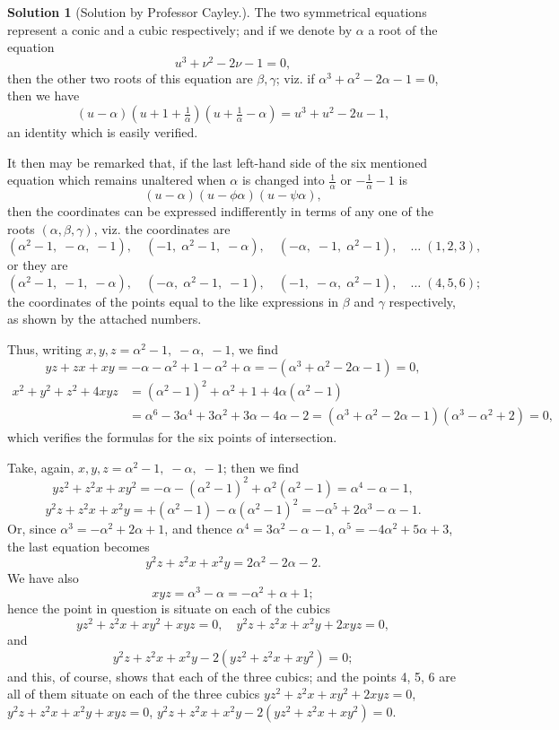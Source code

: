\documentclass[11pt,a4paper]{article}
\theoremstyle{definition}
\newtheorem*{solution}{Solution}
\begin{document}
\begin{solution}[Solution by Professor Cayley.]
The two symmetrical equations represent a conic and a cubic respectively; and if we denote by $\alpha$ a root of the equation
\[
u^3+\nu^2-2\nu-1=0,
\]
then the other two roots of this equation are $\beta, \gamma$; viz. if $\alpha^3+\alpha^2-2\alpha-1=0$, then we have
\[
(u-\alpha)(u+1+\tfrac{1}{\alpha})(u+\tfrac{1}{\alpha}-\alpha) = u^3+u^2-2u-1,
\]
an identity which is easily verified.

It then may be remarked that, if the last left-hand side of the six mentioned equation which remains unaltered when $\alpha$ is changed into $\frac{1}{\alpha}$ or $-\frac{1}{\alpha}-1$ is
\[
(u-\alpha)(u-\phi\alpha)(u-\psi\alpha),
\]
then the coordinates can be expressed indifferently in terms of any one of the roots $(\alpha,\beta,\gamma)$, viz. the coordinates are
\[
(\alpha^2-1, \; -\alpha, \; -1), \quad (-1, \; \alpha^2-1, \; -\alpha), \quad (-\alpha, \; -1, \; \alpha^2-1), \quad \ldots\; (1,2,3),
\]
or they are
\[
(\alpha^2-1, \; -1, \; -\alpha), \quad (-\alpha, \; \alpha^2-1, \; -1), \quad (-1, \; -\alpha, \; \alpha^2-1), \quad \ldots\; (4,5,6);
\]
the coordinates of the points equal to the like expressions in $\beta$ and $\gamma$ respectively, as shown by the attached numbers.

Thus, writing $x,y,z = \alpha^2-1, \; -\alpha, \; -1$, we find
\[
yz+zx+xy = -\alpha - \alpha^2 + 1 - \alpha^2 + \alpha = -(\alpha^3+\alpha^2-2\alpha-1) = 0,
\]
\[
\begin{aligned}
x^2+y^2+z^2+4xyz &= (\alpha^2-1)^2 + \alpha^2 + 1 + 4\alpha(\alpha^2-1) \\
&= \alpha^6 - 3\alpha^4 + 3\alpha^2 + 3\alpha - 4\alpha - 2 = (\alpha^3+\alpha^2-2\alpha-1)(\alpha^3-\alpha^2+2) = 0,
\end{aligned}
\]
which verifies the formulas for the six points of intersection.

Take, again, $x,y,z = \alpha^2-1, \; -\alpha, \; -1$; then we find
\[
yz^2+z^2x+xy^2 = -\alpha - (\alpha^2-1)^2 + \alpha^2(\alpha^2-1) = \alpha^4 - \alpha - 1,
\]
\[
y^2z+z^2x+x^2y = +(\alpha^2-1) - \alpha(\alpha^2-1)^2 = -\alpha^5 + 2\alpha^3 - \alpha - 1.
\]
Or, since $\alpha^3 = -\alpha^2+2\alpha+1$, and thence $\alpha^4 = 3\alpha^2-\alpha-1$, $\alpha^5 = -4\alpha^2+5\alpha+3$, the last equation becomes
\[
y^2z+z^2x+x^2y = 2\alpha^2 - 2\alpha - 2.
\]
We have also
\[
xyz = \alpha^3 - \alpha = -\alpha^2 + \alpha + 1;
\]
hence the point in question is situate on each of the cubics
\[
yz^2+z^2x+xy^2+xyz=0, \quad y^2z+z^2x+x^2y+2xyz=0,
\]
and
\[
y^2z+z^2x+x^2y-2(yz^2+z^2x+xy^2)=0;
\]
and this, of course, shows that each of the three cubics; and the points 4, 5, 6 are all of them situate on each of the three cubics $yz^2+z^2x+xy^2+2xyz=0$, $y^2z+z^2x+x^2y+xyz=0$, $y^2z+z^2x+x^2y-2(yz^2+z^2x+xy^2)=0$.


\end{solution}
\end{document}
